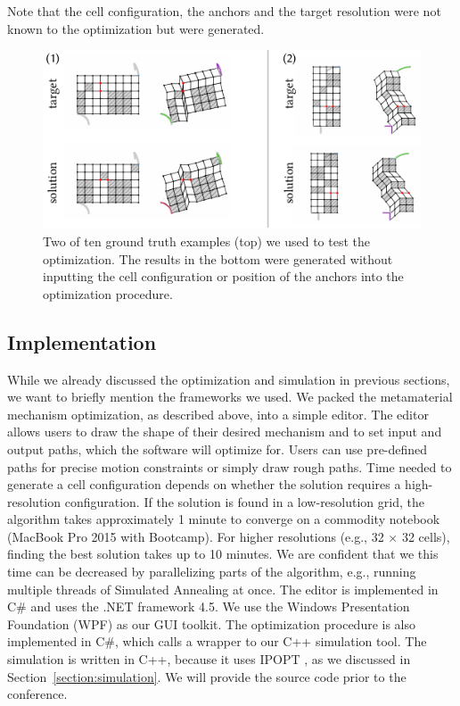 Note that the cell configuration, the anchors and the target resolution were not known to the optimization but were generated.

\begin{figure} [h]
    \includegraphics[width=\textwidth]{chapters/understanding-metamaterial-mechanisms-FIG/15-groundtruth-test.pdf}
    \caption[Short figure name.]{Two of ten ground truth examples (top) we used to test the optimization. The results in the bottom were generated without inputting the cell configuration or position of the anchors into the optimization procedure.
    \label{fig:15-groundtruth-test}}
\end{figure}


\subsection{Implementation}

While we already discussed the optimization and simulation in previous sections, we want to briefly mention the frameworks we used. We packed the metamaterial mechanism optimization, as described above, into a simple editor. The editor allows users to draw the shape of their desired mechanism and to set input and output paths, which the software will optimize for. Users can use pre-defined paths for precise motion constraints or simply draw rough paths. Time needed to generate a cell configuration depends on whether the solution requires a high-resolution configuration. If the solution is found in a low-resolution grid, the algorithm takes approximately 1 minute to converge on a commodity notebook (MacBook Pro 2015 with Bootcamp). For higher resolutions (e.g., 32 $\times$ 32 cells), finding the best solution takes up to 10 minutes. We are confident that we this time can be decreased by parallelizing parts of the algorithm, e.g., running multiple threads of Simulated Annealing at once. The editor is implemented in C\# and uses the .NET framework 4.5. We use the Windows Presentation Foundation (WPF) as our GUI toolkit. The optimization procedure is also implemented in C\#, which calls a wrapper to our C++ simulation tool. The simulation is written in C++, because it uses IPOPT \cite{Waechter2006}, as we discussed in Section~\ref{section:simulation}. We will provide the source code prior to the conference.

